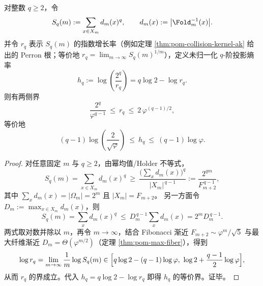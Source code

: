 \begin{proposition}\label{prop:pom-rq-universal-bounds}
对整数 \(q\ge 2\)，令
$$
S_q(m):=\sum_{x\in X_m} d_m(x)^q,\qquad d_m(x):=\bigl|\Fold_m^{-1}(x)\bigr|.
$$
并令 \(r_q\) 表示 \(S_q(m)\) 的指数增长率（例如定理 \ref{thm:pom-collision-kernel-ak} 给出的 Perron 根；等价地 \(r_q=\lim_{m\to\infty}S_q(m)^{1/m}\)），定义未归一化 \(q\)-阶投影熵率
$$
h_q:=\log\!\left(\frac{2^q}{r_q}\right)=q\log 2-\log r_q.
$$
则有两侧界
$$
\frac{2^q}{\varphi^{q-1}}\ \le\ r_q\ \le\ 2\,\varphi^{(q-1)/2},
$$
等价地
$$
(q-1)\log\!\left(\frac{2}{\sqrt{\varphi}}\right)\ \le\ h_q\ \le\ (q-1)\log\varphi.
$$
\end{proposition}
\begin{proof}
对任意固定 \(m\) 与 \(q\ge 2\)，由幂均值/Holder 不等式，
$$
S_q(m)=\sum_{x\in X_m}d_m(x)^q\ \ge\ \frac{\bigl(\sum_x d_m(x)\bigr)^q}{|X_m|^{\,q-1}}
:=\frac{2^{qm}}{F_{m+2}^{\,q-1}},
$$
其中 \(\sum_x d_m(x)=|\Omega_m|=2^m\) 且 \(|X_m|=F_{m+2}\)。
另一方面令 \(D_m:=\max_{x\in X_m} d_m(x)\)，则
$$
S_q(m)=\sum_x d_m(x)^q\ \le\ D_m^{\,q-1}\sum_x d_m(x)=2^m D_m^{\,q-1}.
$$
两式取对数并除以 \(m\)，再令 \(m\to\infty\)，结合 Fibonacci 渐近 \(F_{m+2}\sim \varphi^{m}/\sqrt5\) 与最大纤维渐近 \(D_m=\Theta(\varphi^{m/2})\)（定理 \ref{thm:pom-max-fiber}），得到
$$
\log r_q=\lim_{m\to\infty}\frac{1}{m}\log S_q(m)\in\Bigl[q\log 2-(q-1)\log\varphi,\ \log 2+\frac{q-1}{2}\log\varphi\Bigr],
$$
从而 \(r_q\) 的界成立。代入 \(h_q=q\log 2-\log r_q\) 即得 \(h_q\) 的等价界。证毕。
\end{proof}

